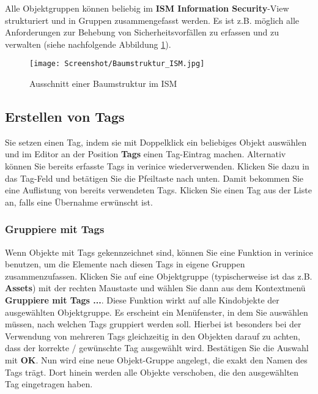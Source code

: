 \documentclass[a4paper,10pt]{book}
\begin{document}
Alle Objektgruppen können beliebig im \textbf{ISM Information Security}-View strukturiert und in Gruppen zusammengefasst werden.
Es ist z.B. möglich alle Anforderungen zur Behebung von Sicherheitsvorfällen zu erfassen und zu verwalten (siehe nachfolgende Abbildung \ref{Ausschnitt einer Baumstruktur im ISM}).
\newline
\begin{figure}[htb!]
  \centering
  \texttt{[image: Screenshot/Baumstruktur\_ISM.jpg]}
  \caption{\label{Ausschnitt einer Baumstruktur im ISM} Ausschnitt einer Baumstruktur im ISM}
\end{figure}

\subsection{Erstellen von Tags}
Sie setzen einen Tag, indem sie mit Doppelklick ein beliebiges Objekt
auswählen und
im Editor an der Position \textbf{Tags} einen Tag-Eintrag machen.
Alternativ können Sie bereits erfasste Tags in verinice wiederverwenden.
Klicken Sie dazu in das Tag-Feld und betätigen Sie die Pfeiltaste nach unten.
Damit bekommen Sie eine Auflistung von bereits verwendeten Tags. Klicken
Sie einen Tag aus der Liste an, falls eine Übernahme erwünscht ist.

\subsubsection{Gruppiere mit Tags} \label{Gruppiere mit Tags}
Wenn Objekte mit Tags gekennzeichnet sind, können Sie eine Funktion in verinice benutzen,
um die Elemente nach diesen Tags in eigene Gruppen zusammenzufassen.
Klicken Sie auf eine Objektgruppe (typischerweise ist das z.B. \textbf{Assets})
mit der rechten Maustaste und wählen Sie dann aus dem Kontextmenü \textbf{Gruppiere mit Tags ...}.
Diese Funktion wirkt auf alle Kindobjekte der ausgewählten Objektgruppe.
Es erscheint ein Menüfenster, in dem Sie auswählen müssen, nach welchen Tags gruppiert werden soll.
Hierbei ist besonders bei der Verwendung von mehreren Tags gleichzeitig in den Objekten
darauf zu achten, dass der korrekte / gewünschte Tag ausgewählt wird. Bestätigen Sie die Auswahl mit
\textbf{OK}. Nun wird eine neue Objekt-Gruppe angelegt, die exakt den Namen des Tags trägt.
Dort hinein werden alle Objekte verschoben, die den ausgewählten Tag eingetragen haben.
\end{document}
